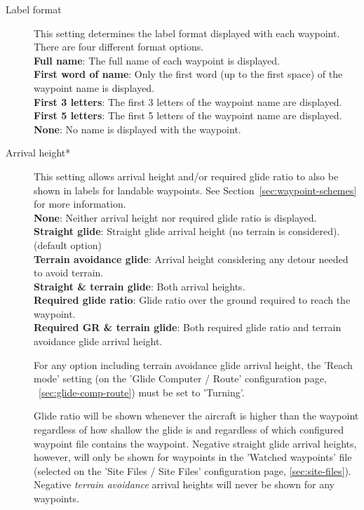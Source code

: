 \begin{description}
\item[Label format]  This setting \label{conf:labels} determines the label format 
  displayed with each waypoint. There are four different format options. \\
  {\bf Full name}: The full name of each waypoint is displayed. \\
  {\bf First word of name}: Only the first word (up to the first space) of the 
  waypoint name is displayed.
 \\
  {\bf First 3 letters}: The first 3 letters of the waypoint name are displayed. \\
  {\bf First 5 letters}: The first 5 letters of the waypoint name are displayed. \\
  {\bf None}: No name is displayed with the waypoint.

\item[Arrival height*] \label{conf:arrivalheight} This setting allows arrival height
and/or required glide ratio to also be shown in labels for landable waypoints. See Section~\ref{sec:waypoint-schemes} for more information.\\
  {\bf None}: Neither arrival height nor required glide ratio is displayed. \\
  {\bf Straight glide}: Straight glide arrival height (no terrain is considered). (default option) \\
  {\bf Terrain avoidance glide}: Arrival height considering any detour needed to avoid terrain. \\
  {\bf Straight \& terrain glide}: Both arrival heights. \\
  {\bf Required glide ratio}: Glide ratio over the ground required to reach the waypoint. \\
  {\bf Required GR \& terrain glide}: Both required glide ratio and terrain avoidance glide arrival height.

  For any option including terrain avoidance glide arrival height, the 'Reach
  mode' setting (on the 'Glide Computer / Route' configuration page,
  ~\ref{sec:glide-comp-route}) must be set to 'Turning'.

  Glide ratio will be shown whenever the aircraft is higher than the waypoint
  regardless of how shallow the glide is and
  regardless of which configured waypoint file contains the waypoint. Negative
  straight glide arrival heights, however, will only be shown for
  waypoints in the 'Watched waypoints' file (selected on the
  'Site Files / Site Files' configuration page, \ref{sec:site-files}). Negative
  \emph{terrain avoidance} arrival heights will never be shown for any waypoints.


\end{description}
